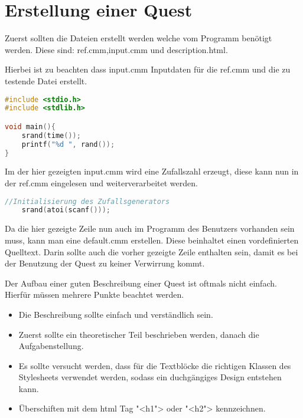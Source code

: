 \section{Erstellung einer Quest}
Zuerst sollten die Dateien erstellt werden welche vom Programm benötigt werden. Diese sind: ref.cmm,input.cmm und description.html.

Hierbei ist zu beachten dass input.cmm Inputdaten für die ref.cmm und die zu testende Datei erstellt.
\begin{lstlisting}[language=C]
#include <stdio.h>
#include <stdlib.h>

void main(){
	srand(time());
	printf("%d ", rand());	
}

\end{lstlisting}
Im der hier gezeigten input.cmm wird eine Zufallszahl erzeugt, diese kann nun in der ref.cmm eingelesen und weiterverarbeitet werden. 
\begin{lstlisting}[language=C]
	//Initialisierung des Zufallsgenerators
	srand(atoi(scanf()));
\end{lstlisting}

Da die hier gezeigte Zeile nun auch im Programm des Benutzers vorhanden sein muss, kann man eine default.cmm erstellen. Diese beinhaltet einen vordefinierten Quelltext. Darin sollte auch die vorher gezeigte Zeile enthalten sein, damit es bei der Benutzung der Quest zu keiner Verwirrung kommt.

Der Aufbau einer guten Beschreibung einer Quest ist oftmals nicht einfach. Hierfür müssen mehrere Punkte beachtet werden. 

\begin{itemize}
\item Die Beschreibung sollte einfach und verständlich sein. 
\item Zuerst sollte ein theoretischer Teil beschrieben werden, danach die Aufgabenstellung.
\item Es sollte versucht werden, dass für die Textblöcke die richtigen Klassen des Stylesheets verwendet werden, sodass ein duchgängiges Design entstehen kann.
\item Überschiften mit dem html Tag "<h1"> oder "<h2"> kennzeichnen.
\end{itemize}
